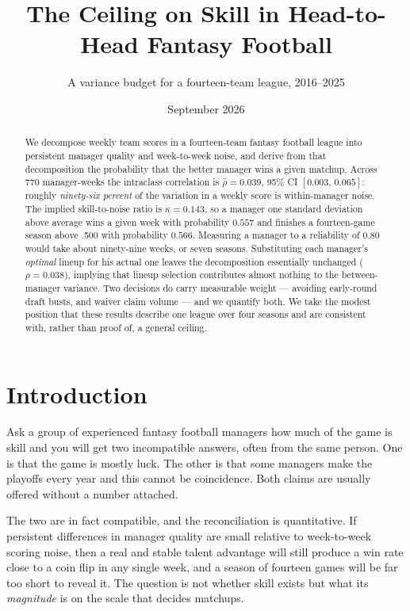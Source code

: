 \documentclass[11pt]{article}
\title{\vspace{-2.2em}The Ceiling on Skill in Head-to-Head Fantasy Football}
\author{A variance budget for a fourteen-team league, 2016--2025}
\date{September 2026}
\begin{document}
\maketitle
\vspace{-1.2em}

\begin{abstract}
\noindent We decompose weekly team scores in a fourteen-team fantasy football
league into persistent manager quality and week-to-week noise, and derive from
that decomposition the probability that the better manager wins a given matchup.
Across 770 manager-weeks the intraclass correlation is
$\widehat{\rho} = 0.039$, 95\% CI $[0.003,\,0.065]$: roughly
\emph{ninety-six percent} of the variation in a weekly score is within-manager
noise. The implied skill-to-noise ratio is $\kappa = 0.143$, so a manager one
standard deviation above average wins a given week with probability $0.557$ and
finishes a fourteen-game season above .500 with probability $0.566$. Measuring a
manager to a reliability of $0.80$ would take about ninety-nine weeks, or seven
seasons. Substituting each manager's \emph{optimal} lineup for his actual one
leaves the decomposition essentially unchanged ($\rho = 0.038$), implying that
lineup selection contributes almost nothing to the between-manager variance.
Two decisions do carry measurable weight --- avoiding early-round draft busts,
and waiver claim volume --- and we quantify both. We take the modest position
that these results describe one league over four seasons and are consistent
with, rather than proof of, a general ceiling.
\end{abstract}

\section{Introduction}

Ask a group of experienced fantasy football managers how much of the game is
skill and you will get two incompatible answers, often from the same person. One
is that the game is mostly luck. The other is that some managers make the
playoffs every year and this cannot be coincidence. Both claims are usually
offered without a number attached.

The two are in fact compatible, and the reconciliation is quantitative. If
persistent differences in manager quality are small relative to week-to-week
scoring noise, then a real and stable talent advantage will still produce a win
rate close to a coin flip in any single week, and a season of fourteen games
will be far too short to reveal it. The question is not whether skill exists but
what its \emph{magnitude} is on the scale that decides matchups.
\end{document}
